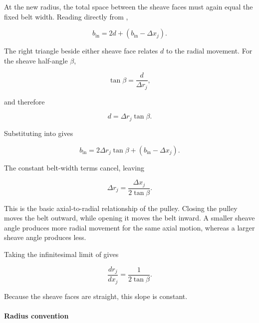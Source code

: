 \documentclass[11pt]{report}
\numberwithin{equation}{section}
\begin{document}
At the new radius, the total space between the sheave faces must again equal
the fixed belt width. Reading directly from
,

\begin{equation}
b_{\mathrm{in}}
=
2d+\left(b_{\mathrm{in}}-\Delta x_j\right).
\label{eq:local_width_balance}
\end{equation}

The right triangle beside either sheave face relates \(d\) to the radial
movement. For the sheave half-angle \(\beta\),

\begin{equation}
\tan\beta
=
\frac{d}{\Delta r_j},
\end{equation}

and therefore

\begin{equation}
d
=
\Delta r_j\tan\beta.
\label{eq:local_triangle_distance}
\end{equation}

Substituting  into
 gives

\begin{equation}
b_{\mathrm{in}}
=
2\Delta r_j\tan\beta
+
\left(b_{\mathrm{in}}-\Delta x_j\right).
\end{equation}

The constant belt-width terms cancel, leaving

\begin{equation}
\Delta r_j
=
\frac{\Delta x_j}{2\tan\beta}.
\label{eq:local_cone_geometry}
\end{equation}

This is the basic axial-to-radial relationship of the pulley. Closing the
pulley moves the belt outward, while opening it moves the belt inward. A
smaller sheave angle produces more radial movement for the same axial motion,
whereas a larger sheave angle produces less.

Taking the infinitesimal limit of
 gives

\begin{equation}
\frac{dr_j}{dx_j}
=
\frac{1}{2\tan\beta}.
\label{eq:local_radius_position_derivative}
\end{equation}

Because the sheave faces are straight, this slope is constant.

\paragraph{Radius convention}
\end{document}
